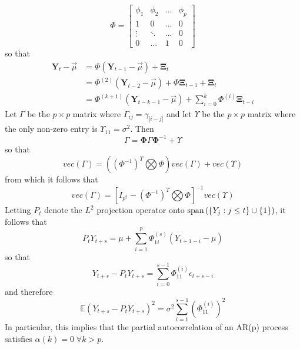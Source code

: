 \documentclass[11pt]{article}
\begin{document}
\begin{equation}
\Phi = \begin{bmatrix}
\phi_1 & \phi_2 & ... & \phi_p \\
1 & 0 & ... & 0\\
\vdots & \ddots & ... & 0 \\
0 & ... & 1 & 0
\end{bmatrix}
\end{equation}
so that
\begin{equation} \label{ARpVec}
\begin{split}
\mathbf{Y}_t - \overrightarrow{\mu}
& = \Phi \left( \mathbf{Y}_{t-1} - \overrightarrow{\mu} \right) + \mathbf{\Xi}_t \\
& = \Phi^{(2)} \left( \mathbf{Y}_{t-2} - \overrightarrow{\mu} \right) + \Phi \mathbf{\Xi}_{t-1} + \mathbf{\Xi}_t \\
& = \Phi^{(k+1)} \left( \mathbf{Y}_{t-k-1} - \overrightarrow{\mu} \right) + \sum_{i=0}^k \Phi^{(i)} \mathbf{\Xi}_{t-i}
\end{split}
\end{equation}
Let $\Gamma$ be the $p \times p$ matrix where $\Gamma_{ij} = \gamma_{|i-j|}$ and let $\Upsilon$ be the $p \times p$ matrix where the only non-zero entry is $\Upsilon_{11} = \sigma^2$. Then
\begin{equation}
\Gamma = \mathbf{\Phi} \Gamma \mathbf{\Phi}^{-1} + \Upsilon
\end{equation}
so that
\begin{equation}
vec \left( \Gamma \right) = \left( \left( \Phi^{-1} \right)^{T} \bigotimes \Phi \right) vec \left( \Gamma \right) + vec \left( \Upsilon \right)
\end{equation}
from which it follows that
\begin{equation}
vec \left( \Gamma \right) = \left[ I_{p^2} - \left( \Phi^{-1} \right)^{T} \bigotimes \Phi \right]^{-1} vec \left( \Upsilon \right)
\end{equation}
Letting $P_t$ denote the $L^2$ projection operator onto $\textup{span} \left( \{ Y_j : j \leq t \} \cup \{ 1 \} \right)$, it follows that
\begin{equation}
P_t Y_{t+s} = \mu + \sum_{i=1}^p \Phi^{(s)}_{1i} \left( Y_{t+1-i} - \mu \right)
\end{equation}
so that
\begin{equation}
Y_{t+s} - P_t Y_{t+s} = \sum_{i=0}^{s-1} \Phi^{(i)}_{11} \epsilon_{t+s-i}
\end{equation}
and therefore
\begin{equation}
\mathbb{E} \left( Y_{t+s} - P_t Y_{t+s} \right) ^ 2
= \sigma^2 \sum_{i=1}^{s-1} \left( \Phi_{11}^{(i)} \right)^2
\end{equation}
In particular, this implies that the partial autocorrelation of an AR(p) process satisfies $\alpha \left( k \right) = 0 \; \forall k > p$.
\end{document}
